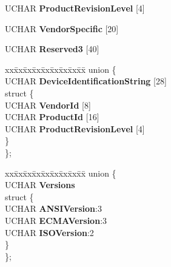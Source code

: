 \begin{DoxyCompactItemize}
\mbox{\label{struct___i_n_q_u_i_r_y_d_a_t_a_a50e9cfd247a2a4c8d7f13f86c243f266}} 
U\+C\+H\+AR {\bfseries Product\+Revision\+Level} \mbox{[}4\mbox{]}
\item 
\mbox{\label{struct___i_n_q_u_i_r_y_d_a_t_a_aeee2b0b5b1e37f1c1268b69358f56561}} 
U\+C\+H\+AR {\bfseries Vendor\+Specific} \mbox{[}20\mbox{]}
\item 
\mbox{\label{struct___i_n_q_u_i_r_y_d_a_t_a_afb1ed43920163c922353a1e54413b2fe}} 
U\+C\+H\+AR {\bfseries Reserved3} \mbox{[}40\mbox{]}
\item 
\mbox{\label{struct___i_n_q_u_i_r_y_d_a_t_a_a058ff511726058c21ec3992fc346969d}} 
\begin{tabbing}
xx\=xx\=xx\=xx\=xx\=xx\=xx\=xx\=xx\=\kill
union \{\\
\>UCHAR {\bfseries DeviceIdentificationString} \mbox{[}28\mbox{]}\\
\mbox{\label{union___i_n_q_u_i_r_y_d_a_t_a_1_1_0D1113_a5dbb2b0f25fce5470ea86faf62b5f2ce}} 
\>struct \{\\
\>\>UCHAR {\bfseries VendorId} \mbox{[}8\mbox{]}\\
\>\>UCHAR {\bfseries ProductId} \mbox{[}16\mbox{]}\\
\>\>UCHAR {\bfseries ProductRevisionLevel} \mbox{[}4\mbox{]}\\
\>\} \\
\}; \\

\end{tabbing}\item 
\mbox{\label{struct___i_n_q_u_i_r_y_d_a_t_a_a109e7df962712e5509fa7030d16883c0}} 
\begin{tabbing}
xx\=xx\=xx\=xx\=xx\=xx\=xx\=xx\=xx\=\kill
union \{\\
\>UCHAR {\bfseries Versions}\\
\mbox{\label{union___i_n_q_u_i_r_y_d_a_t_a_1_1_0D1696_aa53ce12ffe76c4a53c4c9fdc320da105}} 
\>struct \{\\
\>\>UCHAR {\bfseries ANSIVersion}:3\\
\>\>UCHAR {\bfseries ECMAVersion}:3\\
\>\>UCHAR {\bfseries ISOVersion}:2\\
\>\} \\
\}; \\


\end{tabbing}
\end{DoxyCompactItemize}
